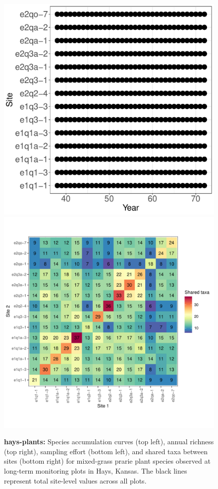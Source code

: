 \documentclass[11pt, oneside]{article}
\begin{document}
\begin{figure}[h!]
\includegraphics[scale = 0.4]{hays-plants-compagnoni_spatiotemporal_sampling_effort.pdf}
\includegraphics[scale = 0.4]{hays-plants-compagnoni_spp_shared.pdf}
\caption{{\bf hays-plants:} Species accumulation curves (top left),  annual richness (top right), sampling effort (bottom left), and shared taxa between sites (bottom right) for mixed-grass prarie plant species observed at long-term monitoring plots in Hays, Kansas. The black lines represent total site-level values across all plots.}
\label{hays-plants}
\end{figure}
\end{document}
